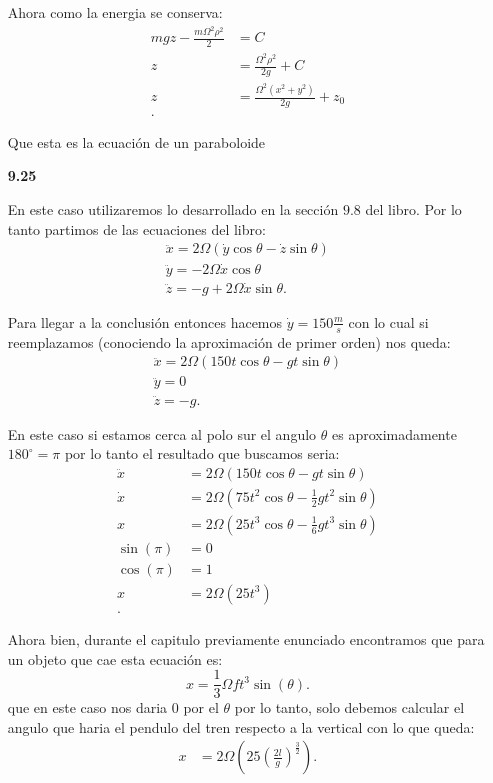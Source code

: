 \documentclass[12pt]{exam}
\begin{document}
\begin{enumerate}
    Ahora como la energia se conserva:
    \begin{align*}
      mgz - \frac{m\Omega^2\rho^2}{2} &= C \\
      z &= \frac{\Omega^2\rho^2}{2g}+C \\
      z &= \frac{\Omega^2\left( x^2+y^2 \right) }{2g} + z_{0} \\
    .\end{align*}

    Que esta es la ecuación de un paraboloide

  \item[\textbf{9.25}]

    En este caso utilizaremos lo desarrollado en la sección $9.8$ del libro. Por lo tanto partimos de las ecuaciones del libro:
    \begin{align*}
      \ddot{x}=2\Omega\left( \dot{y}\cos\theta - \dot{z}\sin\theta \right) \\
      \ddot{y}=-2\Omega\dot{x}\cos\theta\\
      \ddot{z}=-g+2\Omega\dot{x}\sin\theta
    .\end{align*}

    Para llegar a la conclusión entonces hacemos $\dot{y}=150 \frac{m}{s}$ con lo cual si reemplazamos (conociendo la aproximación de primer orden) nos queda:
    \begin{align*}
      \ddot{x}=2\Omega\left( 150t\cos\theta - gt\sin\theta \right) \\
      \ddot{y}=0\\
      \ddot{z}=-g
    .\end{align*}

    En este caso si estamos cerca al polo sur el angulo $\theta$ es aproximadamente $180^{\circ}=\pi$ por lo tanto el resultado que buscamos seria:
    \begin{align*}
      \ddot{x}&=2\Omega\left( 150t\cos\theta - gt\sin\theta \right) \\
      \dot{x}&= 2\Omega\left( 75t^2\cos\theta - \frac{1}{2}gt^2\sin\theta \right)  \\
      x&= 2\Omega\left( 25t^3\cos\theta - \frac{1}{6}gt^3\sin\theta \right) \\
      \sin\left( \pi \right) &= 0 \\
      \cos\left( \pi \right) &= 1 \\
      x&= 2\Omega\left( 25t^3 \right)  \\
    .\end{align*}

    Ahora bien, durante el capitulo previamente enunciado encontramos que para un objeto que cae esta ecuación es: \[
    x=\frac{1}{3}\Omega ft^3\sin\left( \theta \right) 
    .\] que en este caso nos daria $0$ por el $\theta$ por lo tanto, solo debemos calcular el angulo que haria el pendulo del tren respecto a la vertical con lo que queda:
     \begin{align*}
      x&= 2\Omega\left( 25\left( \frac{2l}{g} \right)^{\frac{3}{2}}  \right)
    .\end{align*}


\end{enumerate}
\end{document}
